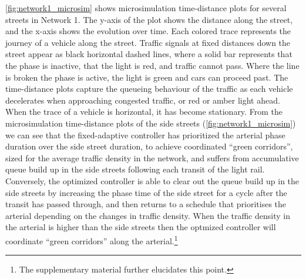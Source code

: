 \cref{fig:network1_microsim} shows microsimulation time-distance plots for several streets in Network 1. The y-axis of the plot
shows the distance along the street, and the x-axis shows the evolution over time. Each colored trace represents the journey of a vehicle along the street. Traffic signals at fixed distances down the street appear as black horizontal dashed lines, where a solid bar represents that the phase is inactive, that the light is red, and traffic cannot pass. Where the line is broken the phase is active, the light is green and cars can proceed past. The time-distance plots capture the queueing behaviour of the traffic as each vehicle decelerates when approaching congested traffic, or red or amber light ahead. When the trace of a vehicle is horizontal, it has become stationary.
From the microsimulation time-distance plots of the side streets (\cref{fig:network1_microsim}) we can see that the fixed-adaptive controller has prioritized the arterial phase duration over the side street duration, to achieve coordinated ``green corridors'', sized for the average traffic density in the network, and suffers from accumulative queue build up in the side streets following each transit of the light rail.
Conversely, the optimized controller is able to clear out the queue build up in the side streets by increasing the phase time of the side street for a cycle after the transit has passed through, and then returns to a schedule that prioritises the arterial depending on the changes in traffic density. When the traffic density in the arterial is higher than the side streets then the optmized controller will coordinate ``green corridors'' along the arterial.\footnote{The supplementary material further elucidates this point.}

